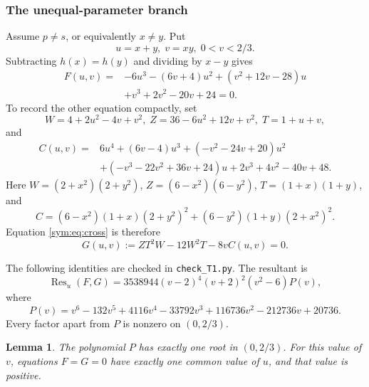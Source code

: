 \documentclass[11pt]{article}
\newtheorem{lemma}[theorem]{Lemma}
\theoremstyle{definition}
\theoremstyle{remark}
\DeclareMathOperator{\Res}{Res}
\begin{document}
\subsubsection*{The unequal-parameter branch}

Assume $p\ne s$, or equivalently $x\ne y$. Put
\[
u=x+y,\; v=xy,\; 0<v<2/3.
\]
Subtracting $h(x)=h(y)$ and dividing by $x-y$ gives
\begin{equation}
\begin{split}
F(u,v)={}&-6u^3-(6v+4)u^2+(v^2+12v-28)u\\
&+v^3+2v^2-20v+24=0.
\end{split}
\label{sym:eq:F}
\end{equation}
To record the other equation compactly, set
\[
W=4+2u^2-4v+v^2,\;
Z=36-6u^2+12v+v^2,\; T=1+u+v,
\]
and
\[
\begin{split}
C(u,v)={}&6u^4+(6v-4)u^3+(-v^2-24v+20)u^2\\
&+(-v^3-22v^2+36v+24)u+2v^3+4v^2-40v+48.
\end{split}
\]
Here $W=(2+x^2)(2+y^2)$, $Z=(6-x^2)(6-y^2)$,
$T=(1+x)(1+y)$, and
\[
C=(6-x^2)(1+x)(2+y^2)^2
+(6-y^2)(1+y)(2+x^2)^2.
\]
Equation \eqref{sym:eq:cross} is therefore
\begin{equation}
G(u,v):=ZT^2W-12W^2T-8vC(u,v)=0.
\label{sym:eq:G}
\end{equation}

The following identities are checked in \texttt{check\_T1.py}. The resultant is
\begin{equation}
\Res_u(F,G)
=3538944(v-2)^4(v+2)^2(v^2-6)P(v),
\label{sym:eq:resultant}
\end{equation}
where
\begin{equation}
P(v)=v^6-132v^5+4116v^4-33792v^3
+116736v^2-212736v+20736.
\label{sym:eq:P}
\end{equation}
Every factor apart from $P$ is nonzero on $(0,2/3)$.

\begin{lemma}
The polynomial $P$ has exactly one root in $(0,2/3)$.
For this value of $v$, equations $F=G=0$ have exactly one common
value of $u$, and that value is positive.
\end{lemma}
\end{document}
